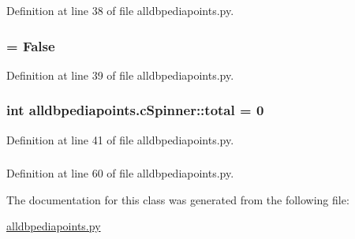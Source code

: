 \-Definition at line 38 of file alldbpediapoints.\-py.

\hypertarget{classalldbpediapoints_1_1cSpinner_a89e9e5c551cabfb28b2adfa3dc838c54}{
\subsubsection[{paused}]{ = \-False}}\label{classalldbpediapoints_1_1cSpinner_a89e9e5c551cabfb28b2adfa3dc838c54}


\-Definition at line 39 of file alldbpediapoints.\-py.

\hypertarget{classalldbpediapoints_1_1cSpinner_a41860d252c7864df06d05adb2405ff1b}{
\subsubsection[{total}]{\setlength{\rightskip}{0pt plus 5cm}int {\bf alldbpediapoints.\-c\-Spinner\-::total} = 0}}\label{classalldbpediapoints_1_1cSpinner_a41860d252c7864df06d05adb2405ff1b}


\-Definition at line 41 of file alldbpediapoints.\-py.

\hypertarget{classalldbpediapoints_1_1cSpinner_a1d2a34e4e7d11115d7eddc27aa321c46}{
\subsubsection[{total}]{}}\label{classalldbpediapoints_1_1cSpinner_a1d2a34e4e7d11115d7eddc27aa321c46}


\-Definition at line 60 of file alldbpediapoints.\-py.



\-The documentation for this class was generated from the following file\-:\begin{DoxyCompactItemize}
\item 
\hyperlink{alldbpediapoints_8py}{alldbpediapoints.\-py}\end{DoxyCompactItemize}
